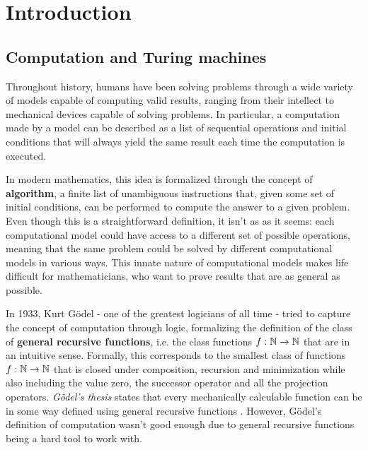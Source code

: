 
\chapter{Introduction} \label{chap:introduction}

\section{Computation and Turing machines}

Throughout history, humans have been solving problems through a wide variety of models capable of computing valid results, ranging from their intellect to mechanical devices capable of solving problems. In particular, a computation made by a model can be described as a list of sequential operations and initial conditions that will always yield the same result each time the computation is executed.

In modern mathematics, this idea is formalized through the concept of \textbf{algorithm}, a finite list of unambiguous instructions that, given some set of initial conditions, can be performed to compute the answer to a given problem. Even though this is a straightforward definition, it isn't as  as it seems: each computational model could have access to a different set of possible operations, meaning that the same problem could be solved by different computational models in various ways. This innate nature of computational models makes life difficult for mathematicians, who want to prove results that are as general as possible. 

In 1933, Kurt Gödel - one of the greatest logicians of all time - tried to capture the concept of computation through logic, formalizing the definition of the class of \textbf{general recursive functions}, i.e. the class functions $f : \mathbb{N} \to \mathbb{N}$ that are  in an intuitive sense. Formally, this corresponds to the smallest class of functions $f : \mathbb{N} \to \mathbb{N}$ that is closed under composition, recursion and minimization while also including the value zero, the successor operator and all the projection operators. \textit{Gödel's thesis} states that every mechanically calculable function can be in some way defined using general recursive functions \cite{godel}. However, Gödel's definition of computation wasn't good enough due to general recursive functions being a hard tool to work with.


